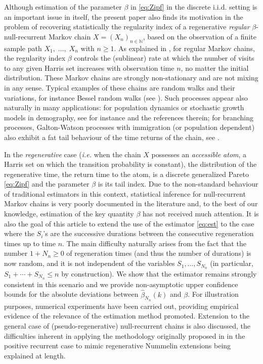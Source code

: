 \documentclass[sn-mathphys-ay]{sn-jnl}%
\begin{document}
Although estimation of the parameter $\beta$ in \eqref{eq:Zipf} in the discrete i.i.d.
setting is an important issue in itself, the present paper also finds its motivation in
the problem of recovering statistically the regularity index of a
regenerative \textit{regular} $\beta$-null-recurrent Markov chain $X=(X_n)_{n\in
            \mathbb{N}}$, based on the observation of a finite sample path $X_1,\; \ldots,\; X_n$
with $n\geq 1$. As explained in \cite{Chen1999, Chen2000}, for regular
Markov chains, the regularity index \(\beta\) controls the (sublinear) rate at
which the number of visits to any given Harris set increases with observation time $n$,
no matter the initial distribution. These Markov chains are strongly
non-stationary and are not mixing in any sense. Typical examples of these chains
are random walks and their variations, for
instance Bessel random walks (see \cite{Alexander2011}). Such
processes appear also naturally in many applications: for population dynamics or
stochastic growth models in demography, see for instance \cite{Adam2016} and the
references therein; for branching processes, Galton-Watson processes with immigration (or
population dependent) also exhibit a fat tail behaviour of the time returns of the chain,
see \cite{Pakes1971, Zubkov1972, KLEBANER1993115}.

In the \textit{regenerative} case (\textit{i.e.} when the chain $X$ possesses an
\textit{accessible atom}, a Harris set on which the transition probability is constant),
the distribution of the regenerative time, the return time to the atom, is a discrete
generalized Pareto \eqref{eq:Zipf} and the parameter $\beta$ is its tail index. Due to
the non-standard behaviour of traditional estimators in this context, statistical
inference for null-recurrent Markov chains is very poorly documented in the literature
\citep{Tjostheim-2001,Han-2010, Myklebust-2012,Gao2013} and, to the best of our
knowledge, estimation of the key quantity $\beta$ has not received much attention. It is
also the goal of this article to extend the use of the estimator \eqref{eq:est} to the
case where the $S_i$'s are the successive durations between the consecutive regeneration
times up to time $n$. The main difficulty naturally arises from the fact that the number
$1+N_n\geq 0$ of regeneration times (and thus the number of durations) is now random, and
it is not independent of the variables $S_1, \ldots, S_{N_n}$ (in
particular, $S_1+\cdots+S_{N_n}\leq n$ by construction). We show that the estimator
remains strongly consistent in this scenario and we provide non-asymptotic upper confidence bounds
for the absolute deviations between $\widehat{{\beta }}_{N_n}\left( k \right)$ and $\beta$.
For illustration purposes, numerical
experiments have been carried out, providing empirical evidence of the relevance of the
estimation method promoted. Extension to the general case of (pseudo-regenerative)
null-recurrent chains is also discussed, the difficulties inherent in applying the
methodology originally proposed in \cite{Bertail2006} in the positive recurrent case to
mimic regenerative Nummelin extensions \citep{Nummelin1984} being explained at length.
\end{document}
